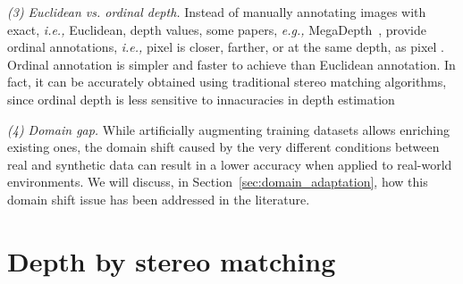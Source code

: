 \documentclass[10pt,journal,compsoc]{IEEEtran}
\newcommand{\ie}{\emph{i.e., }}
\newcommand{\eg}{\emph{e.g., }}
\newcommand{\noi}{\noindent}
\begin{document}
\vspace{6pt}
\noi\textit{(3) Euclidean vs. ordinal depth. } Instead of manually annotating images with exact, \ie Euclidean, depth values, some papers, \eg MegaDepth~\cite{Li_2018_CVPR}, provide ordinal annotations, \ie pixel  is closer, farther, or at the same depth, as pixel . Ordinal annotation is  simpler and faster to achieve than Euclidean annotation. In fact, it can be accurately obtained using traditional stereo matching algorithms, since ordinal depth is less sensitive to innacuracies in depth estimation


\vspace{6pt}
\noi\textit{(4) Domain gap. }  While artificially augmenting training datasets allows enriching existing ones, the  domain shift caused by the very different conditions between real and synthetic data can result in a lower accuracy when applied to real-world environments. We will discuss, in Section~\ref{sec:domain_adaptation}, how this domain shift issue has been addressed in the literature. 







\section{Depth by stereo matching}
\label{sec:depth_by_stereo_matching}\label{sec:stereo_pipeline}
\end{document}
